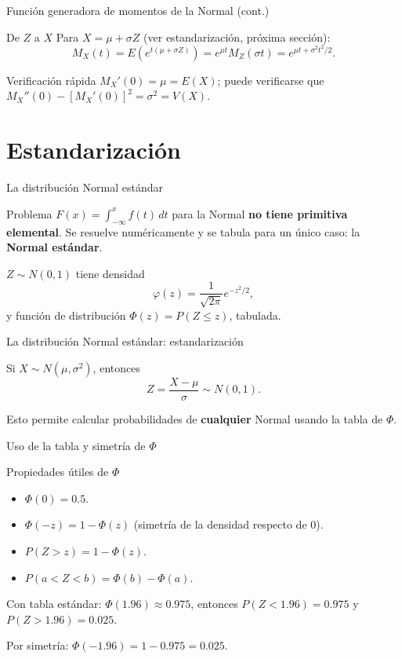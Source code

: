 \documentclass[aspectratio=169,11pt]{beamer}
\begin{document}
\begin{frame}{Función generadora de momentos de la Normal (cont.)}
\begin{block}{De $Z$ a $X$}
Para $X=\mu+\sigma Z$ (ver estandarización, próxima sección):
$$M_X(t)=E(e^{t(\mu+\sigma Z)}) = e^{\mu t}M_Z(\sigma t) = e^{\mu t + \sigma^2t^2/2}.$$
\end{block}

\begin{alertblock}{Verificación rápida}
$M_X'(0)=\mu=E(X)$; puede verificarse que $M_X''(0)-[M_X'(0)]^2 = \sigma^2 = V(X)$.
\end{alertblock}
\end{frame}

\section{Estandarización}

\begin{frame}{La distribución Normal estándar}
\begin{block}{Problema}
$F(x)=\int_{-\infty}^x f(t)\,dt$ para la Normal \textbf{no tiene primitiva elemental}. Se resuelve numéricamente y se tabula para un único caso: la \textbf{Normal estándar}.
\end{block}

\begin{definition}
$Z\sim N(0,1)$ tiene densidad
$$\varphi(z) = \frac{1}{\sqrt{2\pi}}e^{-z^2/2},$$
y función de distribución $\Phi(z) = P(Z\le z)$, tabulada.
\end{definition}
\end{frame}

\begin{frame}{La distribución Normal estándar: estandarización}
\begin{theorem}[Estandarización]
Si $X\sim N(\mu,\sigma^2)$, entonces
$$Z = \frac{X-\mu}{\sigma} \sim N(0,1).$$
\end{theorem}
Esto permite calcular probabilidades de \textbf{cualquier} Normal usando la tabla de $\Phi$.
\end{frame}

\begin{frame}{Uso de la tabla y simetría de $\Phi$}
\begin{block}{Propiedades útiles de $\Phi$}
\begin{itemize}
\item $\Phi(0) = 0.5$.
\item $\Phi(-z) = 1-\Phi(z)$ (simetría de la densidad respecto de 0).
\item $P(Z>z) = 1-\Phi(z)$.
\item $P(a<Z<b) = \Phi(b)-\Phi(a)$.
\end{itemize}
\end{block}

\begin{example}
Con tabla estándar: $\Phi(1.96)\approx 0.975$, entonces $P(Z<1.96)=0.975$ y $P(Z>1.96)=0.025$.

Por simetría: $\Phi(-1.96) = 1-0.975 = 0.025$.
\end{example}
\end{frame}
\end{document}
